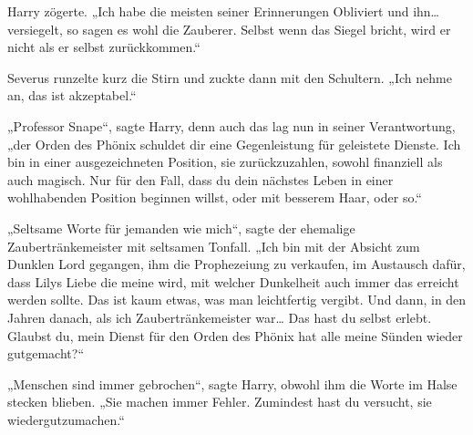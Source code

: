 Harry zögerte.
„Ich habe die meisten seiner Erinnerungen Obliviert und ihn…versiegelt, so sagen es wohl die Zauberer. Selbst wenn das Siegel bricht, wird er nicht als er selbst zurückkommen.“

Severus runzelte kurz die Stirn und zuckte dann mit den Schultern.
„Ich nehme an, das ist akzeptabel.“

„Professor Snape“, sagte Harry, denn auch das lag nun in seiner Verantwortung, „der Orden des Phönix schuldet dir eine Gegenleistung für geleistete Dienste.
Ich bin in einer ausgezeichneten Position, sie zurückzuzahlen, sowohl finanziell als auch magisch. Nur für den Fall, dass du dein nächstes Leben in einer wohlhabenden Position beginnen willst, oder mit besserem Haar, oder so.“

„Seltsame Worte für jemanden wie mich“, sagte der ehemalige Zaubertränkemeister mit seltsamen Tonfall. „Ich bin mit der Absicht zum Dunklen Lord gegangen, ihm die Prophezeiung zu verkaufen, im Austausch dafür, dass Lilys Liebe die meine wird, mit welcher Dunkelheit auch immer das erreicht werden sollte. Das ist kaum etwas, was man leichtfertig vergibt. Und dann, in den Jahren danach, als ich Zaubertränkemeister war… Das hast du selbst erlebt. Glaubst du, mein Dienst für den Orden des Phönix hat alle meine Sünden wieder gutgemacht?“

„Menschen sind immer gebrochen“, sagte Harry, obwohl ihm die Worte im Halse stecken blieben. „Sie machen immer Fehler. Zumindest hast du versucht, sie wiedergutzumachen.“

